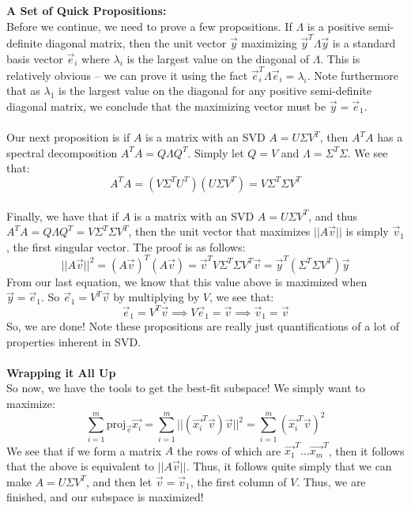 \documentclass[12pt]{amsart}
\begin{document}
\textbf{A Set of Quick Propositions:}\\
Before we continue, we need to prove a few propositions. If $\Lambda$ is a positive semi-definite diagonal matrix, then the unit vector $\vec{y}$ maximizing $\vec{y}^T \Lambda \vec{y}$ is a standard basis vector $\vec{e}_i$ where $\lambda_i$ is the largest value on the diagonal of $\Lambda$. This is relatively obvious -- we can prove it using the fact $\vec{e}_i^T \Lambda \vec{e}_i = \lambda_i$. Note furthermore that as $\lambda_1$ is the largest value on the diagonal for any positive semi-definite diagonal matrix, we conclude that the maximizing vector must be $\vec{y} = \vec{e}_1$.\\
\\
Our next proposition is if $A$ is a matrix with an SVD $A = U \Sigma V^T$, then $A^TA$ has a spectral decomposition $A^TA = Q\Lambda Q^T$. Simply let $Q=V$ and $\Lambda = \Sigma^T\Sigma$. We see that:
\[A^TA = (V \Sigma^T U^T)(U \Sigma V^T) = V\Sigma^T\Sigma V^T\]
\\
Finally, we have that if $A$ is a matrix with an SVD $A = U \Sigma V^T$, and thus $A^TA = Q\Lambda Q^T = V\Sigma^T\Sigma V^T$, then the unit vector that maximizes $||A\vec{v}||$ is simply $\vec{v}_1$, the first singular vector. The proof is as follows:
\[||A\vec{v}||^2 = (A\vec{v})^T(A\vec{v}) = \vec{v}^TV\Sigma^T\Sigma V^T\vec{v} = \vec{y}^T(\Sigma^T\Sigma V^T)\vec{y}\]
From our last equation, we know that this value above is maximized when $\vec{y} = \vec{e}_1$. So $\vec{e}_1 = V^T\vec{v}$ by multiplying by $V$, we see that:
\[\vec{e}_1 = V^T\vec{v} \implies V\vec{e}_1 = \vec{v} \implies \vec{v}_1 = \vec{v}\]
So, we are done! Note these propositions are really just quantifications of a lot of properties inherent in SVD.\\
\\
\textbf{Wrapping it All Up}\\
So now, we have the tools to get the best-fit subspace! We simply want to maximize:
\[\sum_{i=1}^m\mathrm{proj}_{\vec{v}}{\vec{x_i}} = \sum_{i=1}^m ||(\vec{x_i}^T\vec{v})\vec{v}||^2 = 
\sum_{i=1}^m (\vec{x_i}^T\vec{v})^2\]
We see that if we form a matrix $A$ the rows of which are $\vec{x_1}^T \dots \vec{x_m}^T$, then it follows that the above is equivalent to $||A\vec{v}||$. Thus, it follows quite simply that we can make $A = U \Sigma V^T$, and then let $\vec{v} = \vec{v}_1$, the first column of ${V}$. Thus, we are finished, and our subspace is maximized!
\end{document}
